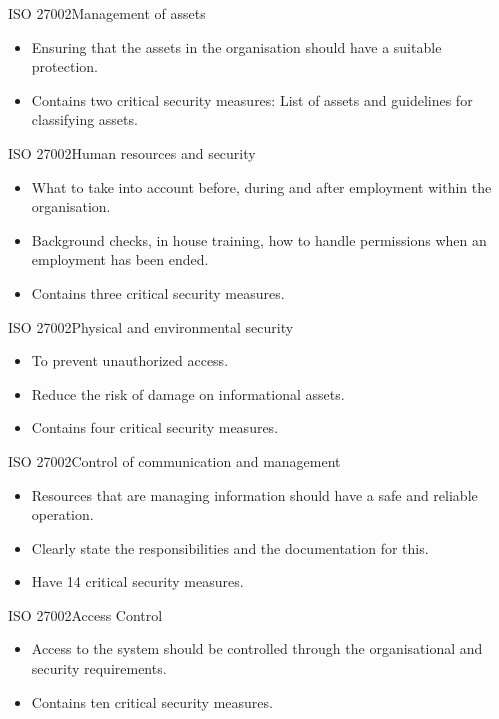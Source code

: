 \documentclass{beamer}
\begin{document}
\begin{frame}{ISO 27002}{Management of assets}
  \begin{itemize}
    \item Ensuring that the assets in the organisation should have a suitable
      protection.
    \item Contains two critical security measures: List of assets and guidelines
      for classifying assets.
  \end{itemize}
\end{frame}

\begin{frame}{ISO 27002}{Human resources and security}
  \begin{itemize}
    \item What to take into account before, during and after employment within
      the organisation. 
    \item Background checks, in house training, how to handle permissions when
      an employment has been ended.
    \item Contains three critical security measures.
  \end{itemize}
\end{frame}

\begin{frame}{ISO 27002}{Physical and environmental security}
  \begin{itemize}
    \item To prevent unauthorized access.
    \item Reduce the risk of damage on informational assets.
    \item Contains four critical security measures.
  \end{itemize}
\end{frame}

\begin{frame}{ISO 27002}{Control of communication and management}
  \begin{itemize}
    \item Resources that are managing information should have a safe and reliable operation.
    \item Clearly state the responsibilities and the documentation for this.
    \item Have 14 critical security measures.
  \end{itemize}
\end{frame}

\begin{frame}{ISO 27002}{Access Control}
  \begin{itemize}
    \item Access to the system should be controlled through the organisational
      and security requirements.
    \item Contains ten critical security measures.
  \end{itemize}
\end{frame}
\end{document}
